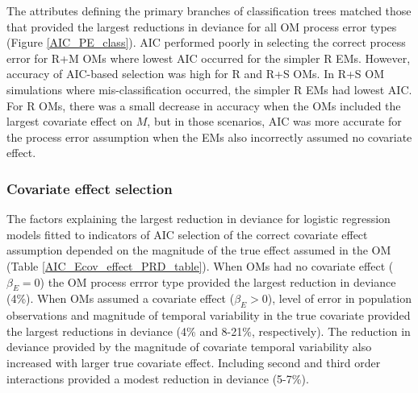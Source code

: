 \documentclass[
  12pt,
]{article}
\begin{document}
The attributes defining the primary branches of classification trees matched those that provided the largest reductions in deviance for all OM process error types (Figure \ref{AIC_PE_class}). AIC performed poorly in selecting the correct process error for R+M OMs where lowest AIC occurred for the simpler R EMs. However, accuracy of AIC-based selection was high for R and R+S OMs. In R+S OM simulations where mis-classification occurred, the simpler R EMs had lowest AIC. For R OMs, there was a small decrease in accuracy when the OMs included the largest covariate effect on \(M\), but in those scenarios, AIC was more accurate for the process error assumption when the EMs also incorrectly assumed no covariate effect.

\subsubsection*{Covariate effect selection}\label{covariate-effect-selection}

The factors explaining the largest reduction in deviance for logistic regression models fitted to indicators of AIC selection of the correct covariate effect assumption depended on the magnitude of the true effect assumed in the OM (Table \ref{AIC_Ecov_effect_PRD_table}). When OMs had no covariate effect (\(\beta_E = 0\)) the OM process errror type provided the largest reduction in deviance (4\%). When OMs assumed a covariate effect (\(\beta_E>0\)), level of error in population observations and magnitude of temporal variability in the true covariate provided the largest reductions in deviance (4\% and 8-21\%, respectively). The reduction in deviance provided by the magnitude of covariate temporal variability also increased with larger true covariate effect. Including second and third order interactions provided a modest reduction in deviance (5-7\%).
\end{document}
